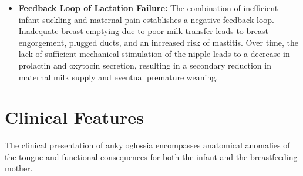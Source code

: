 \begin{itemize}
  \item \textbf{Feedback Loop of Lactation Failure:} The combination of inefficient infant suckling and maternal pain establishes a negative feedback loop. Inadequate breast emptying due to poor milk transfer leads to breast engorgement, plugged ducts, and an increased risk of mastitis. Over time, the lack of sufficient mechanical stimulation of the nipple leads to a decrease in prolactin and oxytocin secretion, resulting in a secondary reduction in maternal milk supply and eventual premature weaning.
\end{itemize}

\section*{Clinical Features}
The clinical presentation of ankyloglossia encompasses anatomical anomalies of the tongue and functional consequences for both the infant and the breastfeeding mother.
